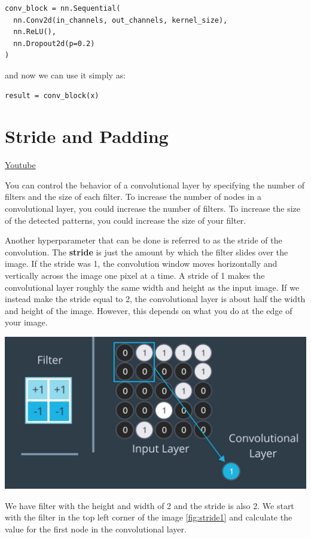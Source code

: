 \begin{lstlisting}
conv_block = nn.Sequential(
  nn.Conv2d(in_channels, out_channels, kernel_size),
  nn.ReLU(),
  nn.Dropout2d(p=0.2)
)
\end{lstlisting}

and now we can use it simply as:
\begin{lstlisting}
result = conv_block(x)
\end{lstlisting}
\section{Stride and Padding}
\href{https://www.youtube.com/watch?v=GmStpNi8jBI&ab_channel=Udacity}{Youtube} \newline

You can control the behavior of a convolutional layer by specifying the number of filters and the size of each filter. To increase the number of nodes in a convolutional layer, you could increase the number of filters. To increase the size of the detected patterns, you could increase the size of your filter. \newline

Another hyperparameter that can be done is referred to as the stride of the convolution. The \textbf{stride} is just the amount by which the filter slides over the image. If the stride was 1, the convolution window moves horizontally and vertically across the image one pixel at a time. A stride of 1 makes the convolutional layer roughly the same width and height as the input image. If we instead make the stride equal to 2, the convolutional layer is about half the width and height of the image. However, this depends on what you do at the edge of your image.

\includegraphics[width=0.75\linewidth]{img//cnn//depth/stride1.png}
\label{fig:stride1}

We have filter with the height and width of 2 and the stride is also 2. We start with the filter in the top left corner of the image \autoref{fig:stride1} and calculate the value for the first node in the convolutional layer.


